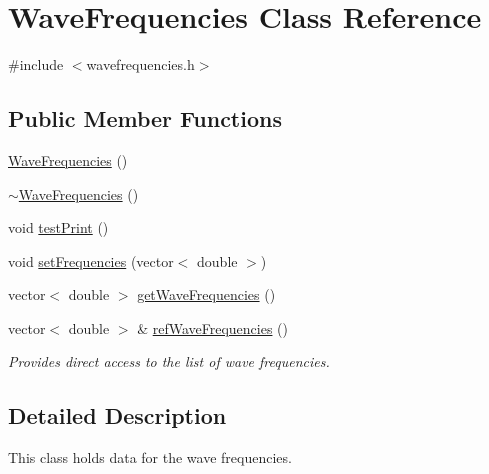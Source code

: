 \hypertarget{class_wave_frequencies}{\section{Wave\-Frequencies Class Reference}
\label{class_wave_frequencies}
}


{\ttfamily \#include $<$wavefrequencies.\-h$>$}

\subsection*{Public Member Functions}
\begin{DoxyCompactItemize}
\item 
\hyperlink{class_wave_frequencies_a73e5875ec967740fdb4fc71a9a9926be}{Wave\-Frequencies} ()
\item 
\hyperlink{class_wave_frequencies_a9ef33af9d3e9a9d79efeb01a8e47fdfc}{$\sim$\-Wave\-Frequencies} ()
\item 
void \hyperlink{class_wave_frequencies_aa66fd622bc69469a8fb43619f6096f1f}{test\-Print} ()
\item 
void \hyperlink{class_wave_frequencies_ad8f27f97cfb137efdec72611e7cdf3b5}{set\-Frequencies} (vector$<$ double $>$)
\item 
vector$<$ double $>$ \hyperlink{class_wave_frequencies_aeb7a093e24733af741c05f1499d776c3}{get\-Wave\-Frequencies} ()
\item 
vector$<$ double $>$ \& \hyperlink{class_wave_frequencies_a578cb4e1172ff4f0b4551e5b872e8178}{ref\-Wave\-Frequencies} ()
\begin{DoxyCompactList}\small\item\em Provides direct access to the list of wave frequencies. \end{DoxyCompactList}\end{DoxyCompactItemize}


\subsection{Detailed Description}
This class holds data for the wave frequencies. 

